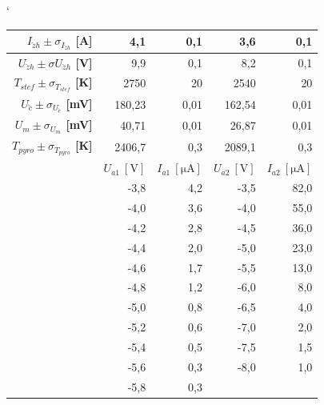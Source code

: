 \documentclass[english]{article}
\begin{document}
\begin{table}[htbp]
\catcode` %
  \centering
    \begin{tabular}{|r|r|r|r|r|}
    \hline
    \boldmath{}\textbf{$I_{\check{z}h}\pm\sigma_{I_{\check{z}h}}$ [A]}\unboldmath{} & 4,1   & 0,1   & 3,6   & 0,1 \bigstrut\\
    \hline
    \boldmath{}\textbf{$U_{\check{z}h}\pm\sigma{U_{\check{z}h}}$ [V]}\unboldmath{} & 9,9   & 0,1   & 8,2   & 0,1 \bigstrut\\
    \hline
    \boldmath{}\textbf{$T_{stef}\pm\sigma_{T_{stef}}$ [K]}\unboldmath{} & 2750  & 20    & 2540  & 20 \bigstrut\\
    \hline
    \boldmath{}\textbf{$U_{\check{c}}\pm\sigma_{U_{\check{c}}}$ [mV]}\unboldmath{} & 180,23 & 0,01  & 162,54 & 0,01 \bigstrut\\
    \hline
    \boldmath{}\textbf{$U_{m}\pm\sigma_{U_{m}}$ [mV]}\unboldmath{} & 40,71 & 0,01  & 26,87 & 0,01 \bigstrut\\
    \hline
    \boldmath{}\textbf{$T_{pyro}\pm\sigma_{T_{pyro}}$ [K]}\unboldmath{} & 2406,7 & 0,3   & 2089,1 & 0,3 \bigstrut\\
    \hline
    \multicolumn{1}{r|}{} & \boldmath{}\textbf{$U_{a1}~\mathrm{[V]}$ }\unboldmath{} & \boldmath{}\textbf{$I_{a1}~\mathrm{[\mu A]}$  }\unboldmath{} & \boldmath{}\textbf{$U_{a2}~\mathrm{[V]}$ }\unboldmath{} & \boldmath{}\textbf{$I_{a2}~\mathrm{[\mu A]}$  }\unboldmath{} \bigstrut\\
    \cline{2-5}\multicolumn{1}{r|}{} & -3,8  & 4,2   & -3,5  & 82,0 \bigstrut\\
    \cline{2-5}\multicolumn{1}{r|}{} & -4,0  & 3,6   & -4,0  & 55,0 \bigstrut\\
    \cline{2-5}\multicolumn{1}{r|}{} & -4,2  & 2,8   & -4,5  & 36,0 \bigstrut\\
    \cline{2-5}\multicolumn{1}{r|}{} & -4,4  & 2,0   & -5,0  & 23,0 \bigstrut\\
    \cline{2-5}\multicolumn{1}{r|}{} & -4,6  & 1,7   & -5,5  & 13,0 \bigstrut\\
    \cline{2-5}\multicolumn{1}{r|}{} & -4,8  & 1,2   & -6,0  & 8,0 \bigstrut\\
    \cline{2-5}\multicolumn{1}{r|}{} & -5,0  & 0,8   & -6,5  & 4,0 \bigstrut\\
    \cline{2-5}\multicolumn{1}{r|}{} & -5,2  & 0,6   & -7,0  & 2,0 \bigstrut\\
    \cline{2-5}\multicolumn{1}{r|}{} & -5,4  & 0,5   & -7,5  & 1,5 \bigstrut\\
    \cline{2-5}\multicolumn{1}{r|}{} & -5,6  & 0,3   & -8,0  & 1,0 \bigstrut\\
    \cline{2-5}\multicolumn{1}{r|}{} & -5,8  & 0,3   & \multicolumn{1}{r}{} & \multicolumn{1}{r}{} \bigstrut\\
    \cline{2-3}\end{tabular}%
    

\end{table}
\end{document}
